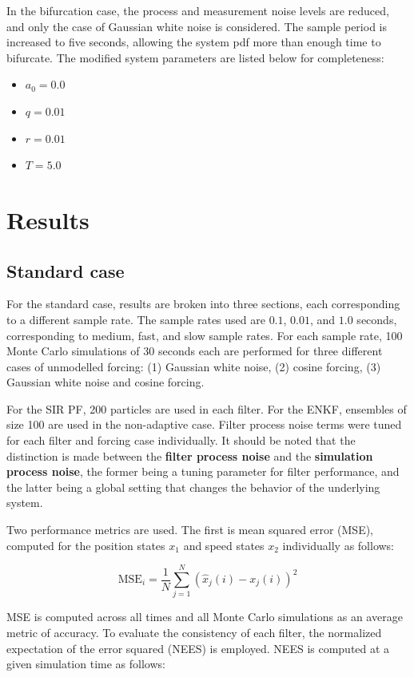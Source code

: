 \documentclass[]{article}
\begin{document}
In the bifurcation case, the process and measurement noise levels are reduced, and only the case of Gaussian white noise is considered. The sample period is increased to five seconds, allowing the system pdf more than enough time to bifurcate. The modified system parameters are listed below for completeness:
\begin{itemize}
\item $a_0 = 0.0$
\item $q = 0.01$
\item $r = 0.01$
\item $T = 5.0$
\end{itemize}


\section{Results}

\subsection{Standard case}

For the standard case, results are broken into three sections, each corresponding to a different sample rate. The sample rates used are $0.1$, $0.01$, and $1.0$ seconds, corresponding to medium, fast, and slow sample rates. For each sample rate, 100 Monte Carlo simulations of 30 seconds each are performed for three different cases of unmodelled forcing: (1) Gaussian white noise, (2) cosine forcing, (3) Gaussian white noise and cosine forcing.

For the SIR PF, 200 particles are used in each filter. For the ENKF, ensembles of size 100 are used in the non-adaptive case. Filter process noise terms were tuned for each filter and forcing case individually. It should be noted that the distinction is made between the \textbf{filter process noise} and the \textbf{simulation process noise}, the former being a tuning parameter for filter performance, and the latter being a global setting that changes the behavior of the underlying system.

Two performance metrics are used. The first is mean squared error (MSE), computed for the position states $x_1$ and speed states $x_2$ individually as follows:

\begin{equation}
\mathrm{MSE}_i = \frac{1}{N} \sum_{j=1}^N (\hat{x}_j(i) - x_j(i))^2
\end{equation}

MSE is computed across all times and all Monte Carlo simulations as an average metric of accuracy. To evaluate the consistency of each filter, the normalized expectation of the error squared (NEES) is employed. NEES is computed at a given simulation time as follows:
\end{document}
